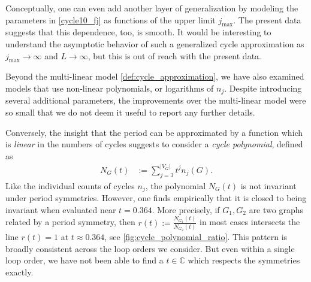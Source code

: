 \documentclass[11pt]{scrartcl}
\numberwithin{equation}{section}
\newcommand{\abs}[1]{\lvert #1 \rvert}
\begin{document}
Conceptually, one can even add another layer of generalization by modeling the parameters in \cref{cycle10_fj} as functions of the upper limit $j_\text{max}$. The present data suggests that this dependence, too, is smooth. It would be interesting to understand the asymptotic behavior of such a generalized cycle approximation as $j_\text{max}\rightarrow \infty$ and $L\rightarrow\infty$, but this is out of reach with the present data. 


Beyond the multi-linear model \cref{def:cycle_approximation}, we have also examined models that use non-linear polynomials, or logarithms of $n_j$. Despite introducing several additional parameters, the improvements over the multi-linear model were so small that we do not deem it useful to report any further details.

Conversely, the insight that the period can be approximated by a function which is \emph{linear} in the numbers of cycles  suggests to consider a \emph{cycle polynomial}, defined as
\begin{align}\label{def:cycle_polynomial}
	N_G(t) &:= \sum_{j=3}^{\abs{V_G}} t^j n_j (G) .
\end{align}
Like the individual counts of cycles $n_j$, the polynomial $N_G (t)$ is not invariant under period symmetries. However, one finds empirically that it is closed to being invariant when evaluated near $t= 0.364$. More precisely, if $G_1,G_2$ are two graphs related by a period symmetry, then $r(t):=\frac{N_{G_1}(t)}{N_{G_2}(t)}$ in most cases intersects the line $r(t)=1$ at $t\approx 0.364$, see \cref{fig:cycle_polynomial_ratio}. This pattern is broadly consistent across the loop orders we consider. But even within a single loop order, we have not been able to find a $t\in \mathbb C$ which  respects the symmetries exactly. 
\end{document}

